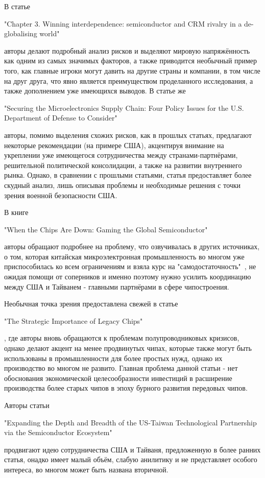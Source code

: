 \documentclass[14pt, a4paper]{extarticle}
\begin{document}
В статье \begin{english} "Chapter 3. Winning interdependence: semiconductor and CRM rivalry in a de-globalising world"\end{english} авторы делают подробный анализ рисков и выделяют мировую напряжённость как одним из самых значимых факторов, а также приводится необычный пример того, как главные игроки могут давить на другие страны и компании, в том числе на друг друга, что явно является преимуществом проделанного исследования, а также дополнением уже имеющихся выводов. В статье же \begin{english} "Securing the Microelectronics Supply Chain: Four Policy Issues for the U.S. Department of Defense to Consider"\end{english} авторы, помимо выделения схожих рисков, как в прошлых статьях, предлагают некоторые рекомендации (на примере США), акцентируя внимание на укреплении уже имеющегося сотрудничества между странами-партнёрами, решительной политической консолидации, а также на развитии внутреннего рынка. Однако, в сравнении с прошлыми статьями, статья предоставляет более скудный анализ, лишь описывая проблемы и необходимые решения с точки зрения военной безопасности США. 

В книге \begin{english} "When the Chips Are Down: Gaming the Global Semiconductor" \end{english} авторы обращают подробнее на проблему, что озвучивалась в других источниках, о том, которая китайская микроэлектронная промышленность во многом уже приспособилась ко всем ограничениям и взяла курс на "самодостаточность"\ , не ожидая помощи от соперников и именно поэтому нужно усилить координацию между США и Тайванем - главными партнёрами в сфере чипостроения. 

Необычная точка зрения предоставлена свежей в статье \begin{english}  "The Strategic Importance of Legacy Chips"\end{english}, где авторы вновь обращаются к проблемам полупроводниковых кризисов, однако делают акцент на менее продвинутых чипах, которые также могут быть использованы в промышленности для более простых нужд, однако их производство во многом не развито. Главная проблема данной статьи - нет обоснования экономической целесообразности инвестиций в расширение производства более старых чипов в эпоху бурного развития передовых чипов.

Авторы статьи \begin{english} "Expanding the Depth and Breadth of the US-Taiwan Technological Partnership via the Semiconductor Ecosystem"\end{english} продвигают идею сотрудничества США и Тайваня, предложенную в более ранних статья, онадко имеет малый объём, слабую анилитику и не представляет особого интереса, во многом может быть названа вторичной. 
\end{document}
